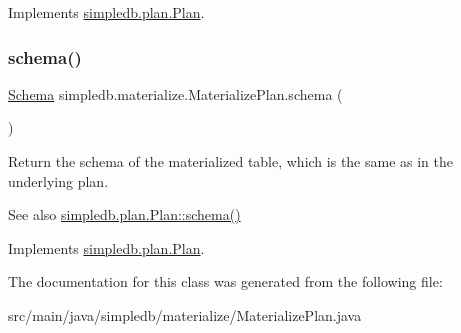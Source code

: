 Implements \hyperlink{interfacesimpledb_1_1plan_1_1Plan_a187e06657d356c80a7f743d7ff8fd257}{simpledb.\+plan.\+Plan}.

\mbox{\label{classsimpledb_1_1materialize_1_1MaterializePlan_aa15451a3ee0639ccca88ca332d050b57}} 
\subsubsection{\texorpdfstring{schema()}{schema()}}
{\footnotesize\ttfamily \hyperlink{classsimpledb_1_1record_1_1Schema}{Schema} simpledb.\+materialize.\+Materialize\+Plan.\+schema (\begin{DoxyParamCaption}{ }\end{DoxyParamCaption})\hspace{0.3cm}{\ttfamily [inline]}}

Return the schema of the materialized table, which is the same as in the underlying plan. \begin{DoxySeeAlso}{See also}
\hyperlink{interfacesimpledb_1_1plan_1_1Plan_ad0ee1aa2c4e7147e9f8fc6f3301fa986}{simpledb.\+plan.\+Plan\+::schema()} 
\end{DoxySeeAlso}


Implements \hyperlink{interfacesimpledb_1_1plan_1_1Plan_ad0ee1aa2c4e7147e9f8fc6f3301fa986}{simpledb.\+plan.\+Plan}.



The documentation for this class was generated from the following file\+:\begin{DoxyCompactItemize}
\item 
src/main/java/simpledb/materialize/Materialize\+Plan.\+java\end{DoxyCompactItemize}
